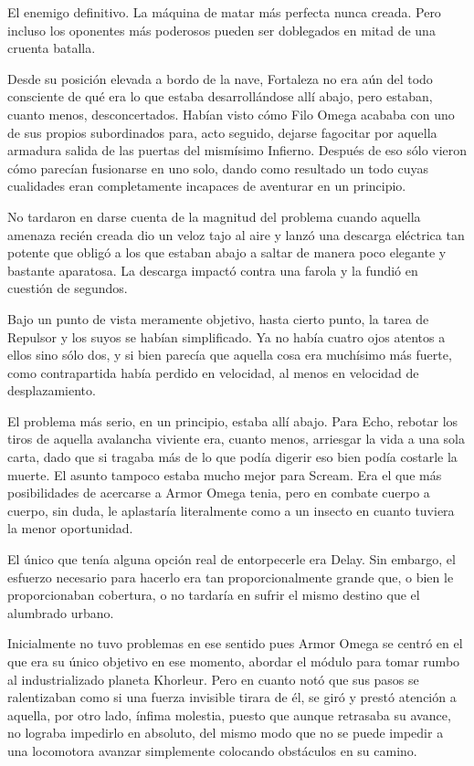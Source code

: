 El enemigo definitivo. La máquina de matar más perfecta nunca creada. Pero incluso los oponentes más poderosos pueden ser doblegados en mitad de una cruenta batalla.

\fancyparbreak
Desde su posición elevada a bordo de la nave, Fortaleza no era aún del todo consciente de qué era lo que estaba desarrollándose allí abajo, pero estaban, cuanto menos, desconcertados. Habían visto cómo Filo Omega acababa con uno de sus propios subordinados para, acto seguido, dejarse fagocitar por aquella armadura salida de las puertas del mismísimo Infierno. Después de eso sólo vieron cómo parecían fusionarse en uno solo, dando como resultado un todo cuyas cualidades eran completamente incapaces de aventurar en un principio.

No tardaron en darse cuenta de la magnitud del problema cuando aquella amenaza recién creada dio un veloz tajo al aire y lanzó una descarga eléctrica tan potente que obligó a los que estaban abajo a saltar de manera poco elegante y bastante aparatosa. La descarga impactó contra una farola y la fundió en cuestión de segundos.

Bajo un punto de vista meramente objetivo, hasta cierto punto, la tarea de Repulsor y los suyos se habían simplificado. Ya no había cuatro ojos atentos a ellos sino sólo dos, y si bien parecía que aquella cosa era muchísimo más fuerte, como contrapartida había perdido en velocidad, al menos en velocidad de desplazamiento.

El problema más serio, en un principio, estaba allí abajo. Para Echo, rebotar los tiros de aquella avalancha viviente era, cuanto menos, arriesgar la vida a una sola carta, dado que si tragaba más de lo que podía digerir eso bien podía costarle la muerte. El asunto tampoco estaba mucho mejor para Scream. Era el que más posibilidades de acercarse a Armor Omega tenia, pero en combate cuerpo a cuerpo, sin duda, le aplastaría literalmente como a un insecto en cuanto tuviera la menor oportunidad.

El único que tenía alguna opción real de entorpecerle era Delay. Sin embargo, el esfuerzo necesario para hacerlo era tan proporcionalmente grande que, o bien le proporcionaban cobertura, o no tardaría en sufrir el mismo destino que el alumbrado urbano.

Inicialmente no tuvo problemas en ese sentido pues Armor Omega se centró en el que era su único objetivo en ese momento, abordar el módulo para tomar rumbo al industrializado planeta Khorleur. Pero en cuanto notó que sus pasos se ralentizaban como si una fuerza invisible tirara de él, se giró y prestó atención a aquella, por otro lado, ínfima molestia, puesto que aunque retrasaba su avance, no lograba impedirlo en absoluto, del mismo modo que no se puede impedir a una locomotora avanzar simplemente colocando obstáculos en su camino.

